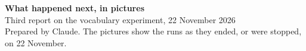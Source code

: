 \documentclass[10pt,letterpaper]{article}
\begin{document}
\begin{center}
{\LARGE\bfseries What happened next, in pictures}\\[5pt]
{\large Third report on the vocabulary experiment, 22 November 2026}\\[3pt]
{\small\color{soft} Prepared by Claude. The pictures show the runs as they ended, or were stopped, on 22 November.}
\end{center}


\end{document}
